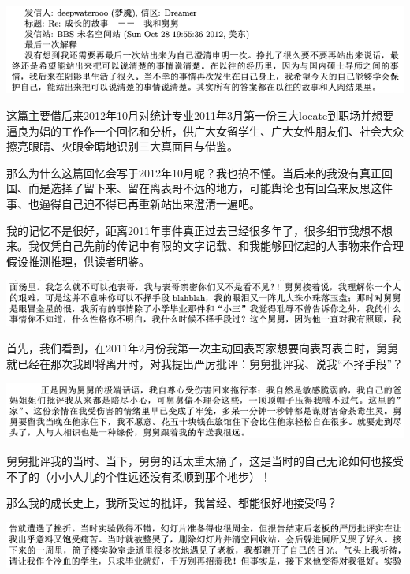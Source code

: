 \documentclass[9pt, b5paper]{article}
\begin{document}
\begin{center}
\includegraphics[width=.9\linewidth]{./pic/backups_plans_p1p143-1.png.png}
\end{center}

这篇主要借后来2012年10月对统计专业2011年3月第一份三大locate到职场并想要逼良为娼的工作作一个回忆和分析，供广大女留学生、广大女性朋友们、社会大众擦亮眼睛、火眼金睛地识别三大真面目与借鉴。

那么为什么这篇回忆会写于2012年10月呢？我也搞不懂。当后来的我没有真正回国、而是选择了留下来、留在离表哥不远的地方，可能舆论也有回刍来反思这件事、也逼得自己迫不得已再重新站出来澄清一遍吧。

我的记忆不是很好，距离2011年事件真正过去已经很多年了，很多细节我想不想来。我仅凭自己先前的传记中有限的文字记载、和我能够回忆起的人事物来作合理假设推测推理，供读者明鉴。

\begin{center}
\includegraphics[width=.9\linewidth]{./pic/backups_plans_20210412_103658.png}
\end{center}

首先，我们看到，在2011年2月份我第一次主动回表哥家想要向表哥表白时，舅舅就已经在那次我即将离开时，对我提出严厉批评：舅舅批评我、说我“不择手段”？

\begin{center}
\includegraphics[width=.9\linewidth]{./pic/backups_plans_20210412_110028.png}
\end{center}

舅舅批评我的当时、当下，舅舅的话太重太痛了，这是当时的自己无论如何也接受不了的（小小人儿的个性远还没有柔顺到那个地步）！

那么我的成长史上，我所受过的批评，我曾经、都能很好地接受吗？

\begin{center}
\includegraphics[width=.9\linewidth]{./pic/backups_plans_20210412_110225.png}
\end{center}
\end{document}
